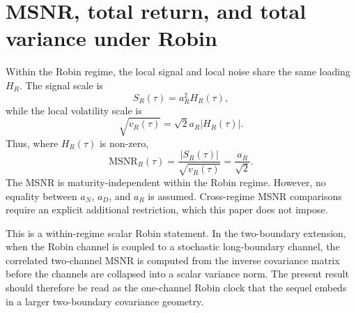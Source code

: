 \documentclass[11pt]{article}
\newcommand{\MSNR}{\mathrm{MSNR}}
\numberwithin{equation}{section}
\begin{document}
\section{MSNR, total return, and total variance under Robin}

Within the Robin regime, the local signal and local noise share the same loading $H_R$. The signal scale is
\begin{equation}
S_R(\tau)=a_R^2H_R(\tau),
\end{equation}
while the local volatility scale is
\begin{equation}
\sqrt{v_R(\tau)}=\sqrt{2}a_R|H_R(\tau)|.
\end{equation}
Thus, where $H_R(\tau)$ is non-zero,
\begin{equation}
\label{eq:robin-msnr}
\MSNR_R(\tau)=\frac{|S_R(\tau)|}{\sqrt{v_R(\tau)}}=\frac{a_R}{\sqrt{2}}.
\end{equation}
The MSNR is maturity-independent within the Robin regime. However, no equality between $a_N$, $a_D$, and $a_R$ is assumed. Cross-regime MSNR comparisons require an explicit additional restriction, which this paper does not impose.

This is a within-regime scalar Robin statement. In the two-boundary extension, when the Robin channel is coupled to a stochastic long-boundary channel, the correlated two-channel MSNR is computed from the inverse covariance matrix before the channels are collapsed into a scalar variance norm. The present result should therefore be read as the one-channel Robin clock that the sequel embeds in a larger two-boundary covariance geometry.
\end{document}
